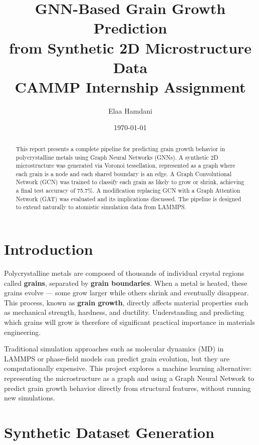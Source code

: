 \documentclass[12pt, a4paper]{article}
\title{
    \vspace{-1cm}
    \Large\textbf{GNN-Based Grain Growth Prediction} \\
    \large from Synthetic 2D Microstructure Data \\
    \vspace{0.5cm}
    \normalsize CAMMP Internship Assignment
}
\author{Elaa Hamdani}
\date{\today}
\begin{document}
\maketitle

\begin{abstract}
This report presents a complete pipeline for predicting grain growth behavior
in polycrystalline metals using Graph Neural Networks (GNNs). A synthetic 2D
microstructure was generated via Voronoi tessellation, represented as a graph
where each grain is a node and each shared boundary is an edge. A Graph
Convolutional Network (GCN) was trained to classify each grain as likely to
grow or shrink, achieving a final test accuracy of 75.7\%. A modification
replacing GCN with a Graph Attention Network (GAT) was evaluated and its
implications discussed. The pipeline is designed to extend naturally to
atomistic simulation data from LAMMPS.
\end{abstract}

\section{Introduction}

Polycrystalline metals are composed of thousands of individual crystal regions
called \textbf{grains}, separated by \textbf{grain boundaries}. When a metal
is heated, these grains evolve — some grow larger while others shrink and
eventually disappear. This process, known as \textbf{grain growth}, directly
affects material properties such as mechanical strength, hardness, and
ductility. Understanding and predicting which grains will grow is therefore
of significant practical importance in materials engineering.

Traditional simulation approaches such as molecular dynamics (MD) in LAMMPS
or phase-field models can predict grain evolution, but they are
computationally expensive. This project explores a machine learning
alternative: representing the microstructure as a graph and using a Graph
Neural Network to predict grain growth behavior directly from structural
features, without running new simulations.

\section{Synthetic Dataset Generation}
\end{document}
